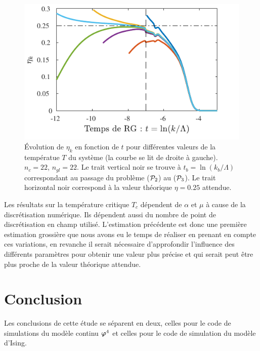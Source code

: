\documentclass[10.5pt]{article}
\begin{document}
\begin{multicols}{2}
\begin{figure}[H]
\begin{center}
	\includegraphics[width=0.95\columnwidth]{MesuRes.pdf}
\end{center}
\caption{Évolution de $\eta_k$ en fonction de $t$ pour différentes valeurs de la températue $T$ du système (la courbe se lit de droite à gauche). $n_c=22$, $n_{gl} = 22$. Le trait vertical noir se trouve à $t_b = \ln(k_b/\Lambda)$ correspondant au passage du problème ($\mathcal{P}_2$) au ($\mathcal{P}_3$). Le trait horizontal noir correspond à la valeur théorique $\eta = 0.25$ attendue. }
\label{fig:etaMesu}
\end{figure}

Les résultats sur la température critique $T_c$ dépendent de $\alpha$ et $\mu$ à cause de la discrétisation numérique. Ils dépendent aussi du nombre de point de discrétisation en champ utilisé. L'estimation précédente est donc une première estimation grossière que nous avons eu le temps de réaliser en prenant en compte ces variations, en revanche il serait nécessaire d'approfondir l'influence des différents paramètres pour obtenir une valeur plus précise et qui serait peut être plus proche de la valeur théorique attendue.


\section{Conclusion}

Les conclusions de cette étude se séparent en deux, celles pour le code de simulations du modèle continu $\boldsymbol{ \varphi}^4$ et celles pour le code de simulation du modèle d'Ising. \\


\end{multicols}
\end{document}
